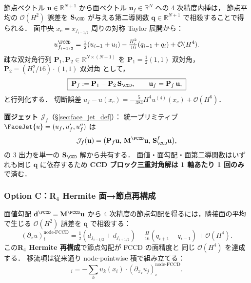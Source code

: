 節点ベクトル $\mathbf{u}\in\mathbb{R}^{N+1}$ から面ベクトル
$\mathbf{u}_f\in\mathbb{R}^N$ への 4 次精度内挿は，
節点平均の $\mathcal{O}(H^2)$ 誤差を $\mathbf{S}_{\CCD}$ が与える第二導関数
$\mathbf{q}\in\mathbb{R}^{N+1}$ で相殺することで得られる．
面中央 $x_c = x_{f_{i-1/2}}$ 周りの対称 Taylor 展開から：
\begin{equation}
  u^{\FCCD}_{f_{i-1/2}}
  = \tfrac{1}{2}(u_{i-1}+u_i)
  - \tfrac{H_i^2}{16}(q_{i-1}+q_i)
  + \mathcal{O}(H^4).
  \label{eq:fccd_adv_face_value}
\end{equation}
疎な双対角行列 $\mathbf{P}_1, \mathbf{P}_2\in\mathbb{R}^{N\times(N+1)}$ を
$\mathbf{P}_1 = \tfrac{1}{2}(1,1)\text{ 双対角}$，
$\mathbf{P}_2 = (H_i^2/16)\cdot(1,1)\text{ 双対角}$ として，
\begin{equation}
  \boxed{\;
  \mathbf{P}_f := \mathbf{P}_1 - \mathbf{P}_2\,\mathbf{S}_{\CCD},
  \qquad \mathbf{u}_f = \mathbf{P}_f\,\mathbf{u},
  \;}
  \label{eq:fccd_adv_Pf}
\end{equation}
と行列化する．
切断誤差 $u_f - u(x_c) = -\tfrac{5}{384}H^4 u^{(4)}(x_c) + \mathcal{O}(H^6)$．

\noindent\textbf{面ジェット $\mathcal{J}_f$}（\S\ref{sec:face_jet_def}）：
統一プリミティブ $\FaceJet{u} = (u_f, u'_f, u''_f)$ は
\begin{equation}
  \mathcal{J}_f(\mathbf{u}) = \bigl(\mathbf{P}_f\mathbf{u},\,
  \mathbf{M}^{\FCCD}\mathbf{u},\,
  \mathbf{S}_{\CCD}^f\mathbf{u}\bigr),
  \label{eq:fccd_adv_jet}
\end{equation}
の 3 出力を単一の $\mathbf{S}_{\CCD}$ 解から共有する．
面値・面勾配・面第二導関数はいずれも同じ $\mathbf{q}$ に依存するため
\textbf{CCD ブロック三重対角解は 1 軸あたり 1 回のみ}で済む．

\subsubsection{\texorpdfstring{Option C：R$_4$ Hermite 面→節点再構成}{Option C：R\_4 Hermite 面→節点再構成}}
\label{sec:fccd_adv_option_c}

面値勾配 $\mathbf{d}^{\FCCD} = \mathbf{M}^{\FCCD}\mathbf{u}$ から
4 次精度の節点勾配を得るには，隣接面の平均で生じる
$\mathcal{O}(H^2)$ 誤差を $\mathbf{q}$ で相殺する：
\begin{equation}
  (\partial_x u)^{\text{node-FCCD}}_i
  = \tfrac{1}{2}(d_{f_{i-1/2}} + d_{f_{i+1/2}})
  - \tfrac{H}{16}(q_{i+1} - q_{i-1})
  + \mathcal{O}(H^4).
  \label{eq:fccd_adv_R4}
\end{equation}
この\textbf{R$_4$ Hermite 再構成}で節点勾配が FCCD の面精度と
同じ $\mathcal{O}(H^4)$ を達成する．
移流項は従来通り node-pointwise 積で組み立てる：
\begin{equation}
  [\mathcal{A}^{(j)}]_i = -\sum_k u_k(x_i)\cdot(\partial_{x_k} u_j)^{\text{node-FCCD}}_i.
  \label{eq:fccd_adv_option_c}
\end{equation}

